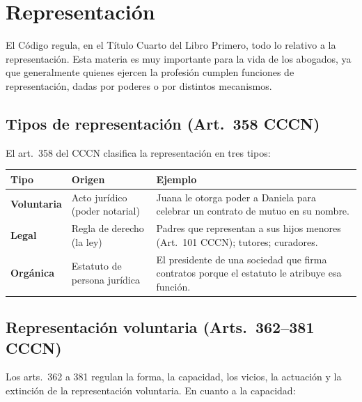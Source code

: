 \documentclass[12pt,oneside]{book}
\begin{document}
\chapter{Representación}

El Código regula, en el Título Cuarto del Libro Primero, todo lo relativo a la representación. Esta materia es muy importante para la vida de los abogados, ya que generalmente quienes ejercen la profesión cumplen funciones de representación, dadas por poderes o por distintos mecanismos.

\section{Tipos de representación (Art.~358 CCCN)}

El art.~358 del CCCN clasifica la representación en tres tipos:

\begin{center}
\renewcommand{\arraystretch}{1.3}
\begin{tabularx}{\textwidth}{
    >{\raggedright\arraybackslash\bfseries}p{2.4cm}
    >{\raggedright\arraybackslash}p{4.4cm}
    >{\raggedright\arraybackslash}X
}
\toprule
\textbf{Tipo} & \textbf{Origen} & \textbf{Ejemplo} \\
\midrule
Voluntaria & Acto jurídico (poder notarial) & Juana le otorga poder a Daniela para celebrar un contrato de mutuo en su nombre. \\
\addlinespace
Legal & Regla de derecho (la ley) & Padres que representan a sus hijos menores (Art.~101 CCCN); tutores; curadores. \\
\addlinespace
Orgánica & Estatuto de persona jurídica & El presidente de una sociedad que firma contratos porque el estatuto le atribuye esa función. \\
\bottomrule
\end{tabularx}
\end{center}

\section{Representación voluntaria (Arts.~362--381 CCCN)}

Los arts.~362 a 381 regulan la forma, la capacidad, los vicios, la actuación y la extinción de la representación voluntaria. En cuanto a la capacidad:
\end{document}
